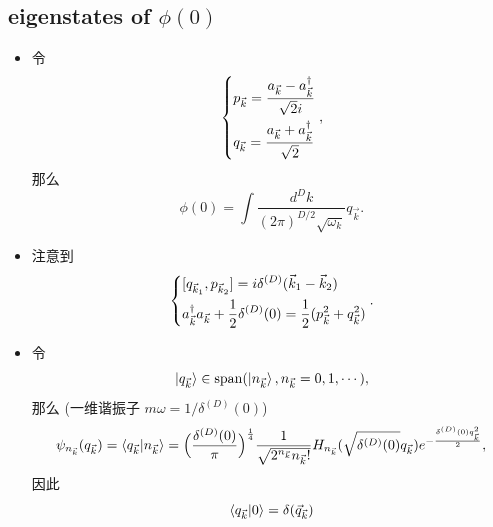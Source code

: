 \documentclass[10pt, a4paper]{article}
\numberwithin{equation}{section}
\begin{document}
	\subsection{eigenstates of \texorpdfstring{$\phi(0)$}{phi(0)}}
	\begin{itemize}
		\item 令
		\begin{equation}
			\begin{dcases}
				p_{\vec{k}} = \frac{a_{\vec{k}} - a^\dag_{\vec{k}}}{\sqrt{2} i} \\
				q_{\vec{k}} = \frac{a_{\vec{k}} + a^\dag_{\vec{k}} }{\sqrt{2}}
			\end{dcases},
		\end{equation}
		那么
		\begin{equation}
			\phi(0) = \int \frac{d^D k}{(2 \pi)^{D / 2} \sqrt{\omega_k}} q_{\vec{k}}.
		\end{equation}
		
		\item 注意到
		\begin{equation}
			\begin{dcases}
				[q_{\vec{k}_1}, p_{\vec{k}_2}] = i \delta^{(D)}(\vec{k}_1 - \vec{k}_2) \\
				a^\dag_{\vec{k}} a_{\vec{k}} + \frac{1}{2} \delta^{(D)}(0) = \frac{1}{2} (p^2_{\vec{k}} + q^2_{\vec{k}})
			\end{dcases}.
		\end{equation}
		
		\item 令
		\begin{equation}
			\ket{q_{\vec{k}}} \in \mathrm{span}(\ket{n_{\vec{k}}}, n_{\vec{k}} = 0, 1, \cdots),
		\end{equation}
		那么 (一维谐振子 $m \omega = 1 / \delta^{(D)}(0)$)
		\begin{equation}
			\psi_{n_{\vec{k}}}(q_{\vec{k}}) = \braket{q_{\vec{k}} | n_{\vec{k}}} = \Big( \frac{\delta^{(D)}(0)}{\pi} \Big)^{\frac{1}{4}} \frac{1}{\sqrt{2^{n_{\vec{k}}} n_{\vec{k}}!}} H_{n_{\vec{k}}}(\sqrt{\delta^{(D)}(0)} q_{\vec{k}}) e^{- \frac{\delta^{(D)}(0) q_{\vec{k}}^2}{2}},
		\end{equation}
		因此
		\begin{equation}
			\braket{q_{\vec{k}} | 0} = \delta(\vec{q}_{\vec{k}})
		\end{equation}
	\end{itemize}
	
\end{document}
